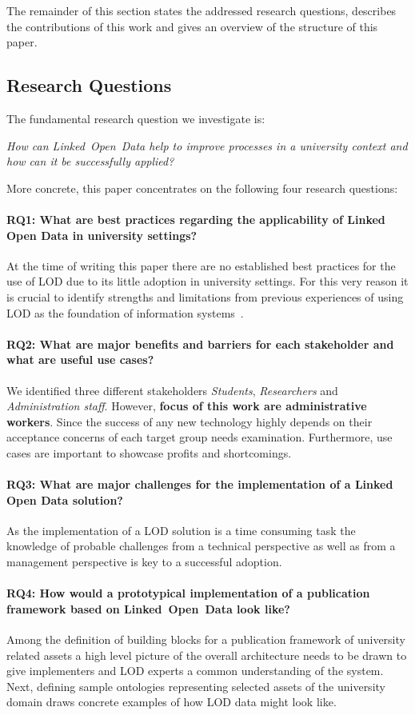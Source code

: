 \documentclass{article}
\begin{document}
The remainder of this section states the addressed research questions, describes the contributions of this work and gives an overview of the structure of this paper.

\subsection{Research Questions}
The fundamental research question we investigate is:
\begin{displayquote}
\textit{How can Linked~Open~Data help to improve processes in a university context and how can it be successfully applied?}
\end{displayquote}
More concrete, this paper concentrates on the following four research questions:
\paragraph{RQ1: What are best practices regarding the applicability of Linked Open Data in university settings?}
At the time of writing this paper there are no established best practices for the use of LOD due to its little adoption in university settings. For this very reason it is crucial to identify strengths and limitations from previous experiences of using LOD as the foundation of information systems~\cite{url:linked-universities-members}. 
\paragraph{RQ2: What are major benefits and barriers for each stakeholder and what are useful use cases?}
We identified three different stakeholders \textit{Students}, \textit{Researchers} and \textit{Administration staff}.
However, \textbf{focus of this work are administrative workers}.
Since the success of any new technology highly depends on their acceptance concerns of each target group needs examination. Furthermore, use cases are important to showcase profits and shortcomings. 
\paragraph{RQ3: What are major challenges for the implementation of a Linked Open Data solution?}
As the implementation of a LOD solution is a time consuming task the knowledge of probable challenges from a technical perspective as well as from a management perspective is key to a successful adoption. 
\paragraph{RQ4: How would a prototypical implementation of a publication framework based on Linked~Open~Data look like?}
Among the definition of building blocks for a publication framework of university related assets a high level picture of the overall architecture needs to be drawn to give implementers and LOD experts a common understanding of the system. Next, defining sample ontologies representing selected assets of the university domain draws concrete examples of how LOD data might look like. 
\end{document}
